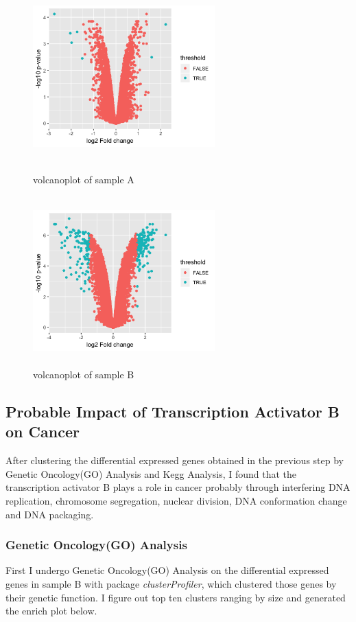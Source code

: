 \documentclass[fleqn,10pt]{wlscirep}
\begin{document}
\begin{figure}[h]
    \begin{minipage}[t]{0.45\linewidth}
    \centering
    \includegraphics[width=7cm,height=6.5cm]{sA.png}
    \caption{volcanoplot of sample A}
    \end{minipage}
    \begin{minipage}[t]{0.45\linewidth}        %
    \hspace{2mm}
    \includegraphics[width=7cm,height=6.5cm]{sB.png}
    \caption{volcanoplot of sample B}
    \end{minipage}
\end{figure}

\subsection*{Probable Impact of Transcription Activator B on Cancer}
After clustering the differential expressed genes obtained in the previous step by Genetic Oncology(GO) Analysis and Kegg Analysis, I found that the transcription activator B plays a role in cancer probably through interfering DNA replication, chromosome segregation, nuclear division, DNA conformation change and DNA packaging.

\subsubsection*{Genetic Oncology(GO) Analysis}
First I undergo Genetic Oncology(GO) Analysis on the differential expressed genes in sample B with package \textit{clusterProfiler}\cite{yu2012clusterprofiler}, which clustered those genes by their genetic function.  I figure out top ten clusters ranging by size and generated the enrich plot below.
\end{document}

